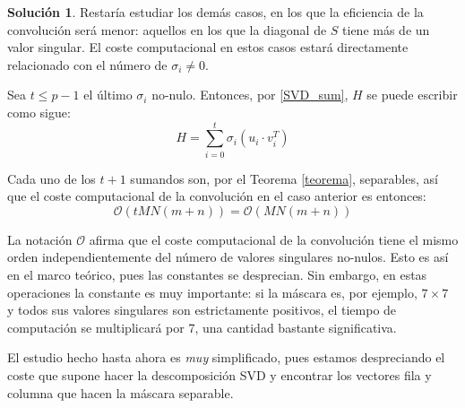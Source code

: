 \documentclass[a4paper, 11pt]{article}
\theoremstyle{definition}
\newtheorem*{solucion}{Solución}
\theoremstyle{theorem}
\begin{document}
\begin{solucion}
      Restaría estudiar los demás casos, en los que la eficiencia de la convolución será menor: aquellos en los que la diagonal de $S$ tiene más de un valor singular. El coste computacional en estos casos estará directamente relacionado con el número de $\sigma_i \neq 0$.

      Sea $t\leq p-1$ el último $\sigma_i$ no-nulo. Entonces, por \eqref{SVD_sum}, $H$ se puede escribir como sigue:
      \[
      H = \sum_{i=0}^t\sigma_i(u_i\cdot v_i^T)
      \]

      Cada uno de los $t+1$ sumandos son, por el Teorema \ref{teorema}, separables, así que el coste computacional de la convolución en el caso anterior es entonces:
      \[
      \mathcal{O}(tMN(m+n)) = \mathcal{O}(MN(m+n))
      \]

      La notación $\mathcal{O}$ afirma que el coste computacional de la convolución tiene el mismo orden independientemente del número de valores singulares no-nulos. Esto es así en el marco teórico, pues las constantes se desprecian. Sin embargo, en estas operaciones la constante es muy importante: si la máscara es, por ejemplo, $7\times7$ y todos sus valores singulares son estrictamente positivos, el tiempo de computación se multiplicará por 7, una cantidad bastante significativa.

      El estudio hecho hasta ahora es \emph{muy} simplificado, pues estamos despreciando el coste que supone hacer la descomposición SVD y encontrar los vectores fila y columna que hacen la máscara separable.
  \end{solucion}
\end{document}
